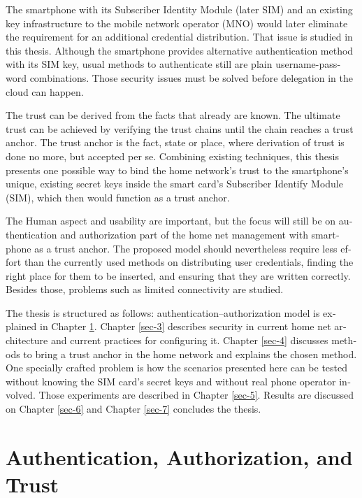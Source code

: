 \documentclass[12pt,a4paper,english]{tutthesis}
\begin{document}
\begin{otherlanguage}{english}
The smartphone with its Subscriber Identity Module (later SIM) and an
existing key infrastructure to the mobile
network operator (MNO) would later eliminate the requirement for an
additional credential distribution. That issue is studied in this
thesis.  Although the smartphone provides alternative authentication
method with its SIM key, usual methods to authenticate still are plain
username-password combinations.  Those security issues must be solved
before delegation in the cloud can happen.



The trust can be derived from the facts that already are known.  
The ultimate trust can be achieved by verifying the trust chains 
until the chain reaches a trust anchor.
The trust anchor is the fact, state or place,
where derivation of trust is done no more, but accepted per se.
Combining existing techniques, this thesis presents one possible way
to bind the home network's trust to the smartphone's unique, existing
secret keys inside the smart card's Subscriber Identify Module (SIM),
which then would function as a trust anchor. 








The Human aspect and usability are important, but the focus will
still be on authentication and authorization part of the home net
management with smartphone as a trust anchor.  The proposed model
should nevertheless require less effort than the currently used methods
on distributing user credentials, finding the right place for them to be
inserted, and ensuring that they are written correctly.
Besides those, problems such as limited connectivity are
studied.





The thesis is structured as follows: authentication--authorization
model is explained in Chapter \ref{sec-2}.  Chapter \ref{sec-3}
describes security in current home net architecture and current
practices for configuring it.  Chapter \ref{sec-4} discusses methods
to bring a trust anchor in the home network and explains the chosen
method.
One specially crafted problem is how the scenarios presented here can be
tested without knowing the SIM card's secret keys and without real phone
operator involved.  Those experiments are described in Chapter \ref{sec-5}.
Results are discussed on Chapter \ref{sec-6} and Chapter \ref{sec-7} concludes the
thesis.
\chapter{Authentication, Authorization, and Trust}
\label{sec-2}




\end{otherlanguage}
\end{document}
